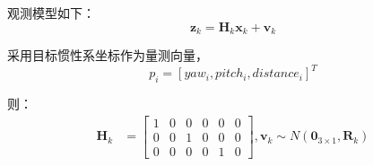 观测模型如下：\begin{equation} \boldsymbol  z_{k} = \boldsymbol H_k\boldsymbol x_k + \boldsymbol {v}_{k} \end{equation}
\par
采用目标惯性系坐标作为量测向量，\begin{equation} p_i = [yaw_i,pitch_i,distance_i]^T \end{equation} 
\par
则：
\begin{equation} \begin{aligned} \boldsymbol H_k &=  \left[\begin{array}{cccccc} 1 & 0 &0 &0 &  0 &0   \\ 0 &0 &1 &0 &0 &0 \\ 0 &0 &0 &0 &1 &0  \end{array}\right],\boldsymbol {v}_{k} \sim N\left(\boldsymbol 0_{3 \times 1}, \boldsymbol {R}_k\right) \end{aligned} \end{equation}
\par


